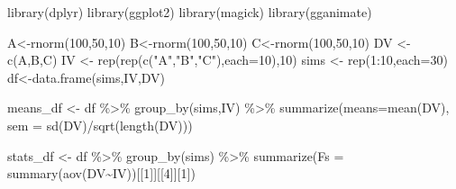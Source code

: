 \documentclass[
  letterpaper,
  DIV=11,
  numbers=noendperiod]{scrreprt}
\newenvironment{Shaded}{\begin{snugshade}}{\end{snugshade}}
\newcommand{\AttributeTok}[1]{\textcolor[rgb]{0.40,0.45,0.13}{#1}}
\newcommand{\DecValTok}[1]{\textcolor[rgb]{0.68,0.00,0.00}{#1}}
\newcommand{\FunctionTok}[1]{\textcolor[rgb]{0.28,0.35,0.67}{#1}}
\newcommand{\NormalTok}[1]{\textcolor[rgb]{0.00,0.23,0.31}{#1}}
\newcommand{\OtherTok}[1]{\textcolor[rgb]{0.00,0.23,0.31}{#1}}
\newcommand{\SpecialCharTok}[1]{\textcolor[rgb]{0.37,0.37,0.37}{#1}}
\newcommand{\StringTok}[1]{\textcolor[rgb]{0.13,0.47,0.30}{#1}}
\begin{document}
\begin{Shaded}
\begin{Highlighting}[]
\FunctionTok{library}\NormalTok{(dplyr)}
\FunctionTok{library}\NormalTok{(ggplot2)}
\FunctionTok{library}\NormalTok{(magick)}
\FunctionTok{library}\NormalTok{(gganimate)}


\NormalTok{A}\OtherTok{\textless{}{-}}\FunctionTok{rnorm}\NormalTok{(}\DecValTok{100}\NormalTok{,}\DecValTok{50}\NormalTok{,}\DecValTok{10}\NormalTok{)}
\NormalTok{B}\OtherTok{\textless{}{-}}\FunctionTok{rnorm}\NormalTok{(}\DecValTok{100}\NormalTok{,}\DecValTok{50}\NormalTok{,}\DecValTok{10}\NormalTok{)}
\NormalTok{C}\OtherTok{\textless{}{-}}\FunctionTok{rnorm}\NormalTok{(}\DecValTok{100}\NormalTok{,}\DecValTok{50}\NormalTok{,}\DecValTok{10}\NormalTok{)}
\NormalTok{DV }\OtherTok{\textless{}{-}} \FunctionTok{c}\NormalTok{(A,B,C)}
\NormalTok{IV }\OtherTok{\textless{}{-}} \FunctionTok{rep}\NormalTok{(}\FunctionTok{rep}\NormalTok{(}\FunctionTok{c}\NormalTok{(}\StringTok{"A"}\NormalTok{,}\StringTok{"B"}\NormalTok{,}\StringTok{"C"}\NormalTok{),}\AttributeTok{each=}\DecValTok{10}\NormalTok{),}\DecValTok{10}\NormalTok{)}
\NormalTok{sims }\OtherTok{\textless{}{-}} \FunctionTok{rep}\NormalTok{(}\DecValTok{1}\SpecialCharTok{:}\DecValTok{10}\NormalTok{,}\AttributeTok{each=}\DecValTok{30}\NormalTok{)}
\NormalTok{df}\OtherTok{\textless{}{-}}\FunctionTok{data.frame}\NormalTok{(sims,IV,DV)}

\NormalTok{means\_df }\OtherTok{\textless{}{-}}\NormalTok{ df }\SpecialCharTok{\%\textgreater{}\%}
  \FunctionTok{group\_by}\NormalTok{(sims,IV) }\SpecialCharTok{\%\textgreater{}\%}
  \FunctionTok{summarize}\NormalTok{(}\AttributeTok{means=}\FunctionTok{mean}\NormalTok{(DV),}
            \AttributeTok{sem =} \FunctionTok{sd}\NormalTok{(DV)}\SpecialCharTok{/}\FunctionTok{sqrt}\NormalTok{(}\FunctionTok{length}\NormalTok{(DV)))}

\NormalTok{stats\_df }\OtherTok{\textless{}{-}}\NormalTok{ df }\SpecialCharTok{\%\textgreater{}\%}
  \FunctionTok{group\_by}\NormalTok{(sims) }\SpecialCharTok{\%\textgreater{}\%}
  \FunctionTok{summarize}\NormalTok{(}\AttributeTok{Fs =} \FunctionTok{summary}\NormalTok{(}\FunctionTok{aov}\NormalTok{(DV}\SpecialCharTok{\textasciitilde{}}\NormalTok{IV))[[}\DecValTok{1}\NormalTok{]][[}\DecValTok{4}\NormalTok{]][}\DecValTok{1}\NormalTok{])}


\end{Highlighting}
\end{Shaded}
\end{document}

